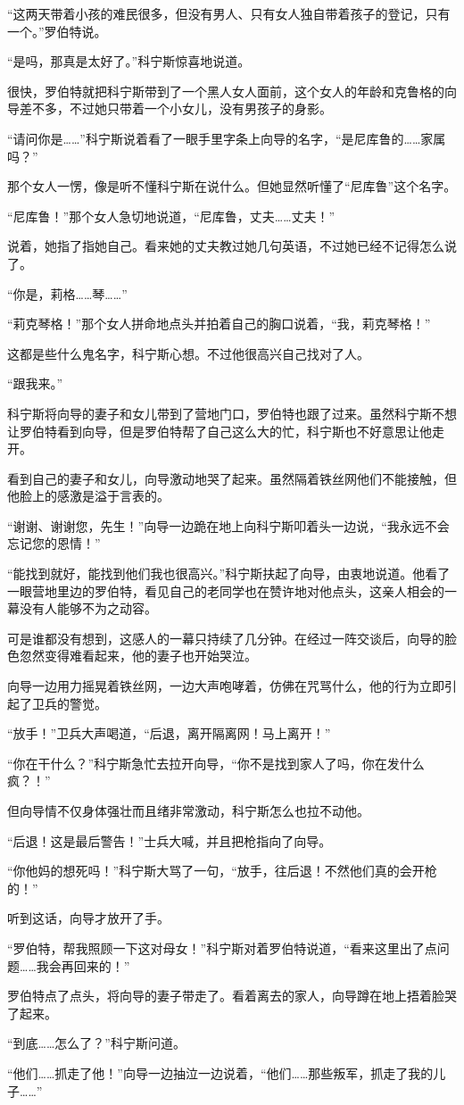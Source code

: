 “这两天带着小孩的难民很多，但没有男人、只有女人独自带着孩子的登记，只有一个。”罗伯特说。

“是吗，那真是太好了。”科宁斯惊喜地说道。

很快，罗伯特就把科宁斯带到了一个黑人女人面前，这个女人的年龄和克鲁格的向导差不多，不过她只带着一个小女儿，没有男孩子的身影。

“请问你是……”科宁斯说着看了一眼手里字条上向导的名字，“是尼库鲁的……家属吗？”

那个女人一愣，像是听不懂科宁斯在说什么。但她显然听懂了“尼库鲁”这个名字。

“尼库鲁！”那个女人急切地说道，“尼库鲁，丈夫……丈夫！”

说着，她指了指她自己。看来她的丈夫教过她几句英语，不过她已经不记得怎么说了。

“你是，莉格……琴……”

“莉克琴格！”那个女人拼命地点头并拍着自己的胸口说着，“我，莉克琴格！”

这都是些什么鬼名字，科宁斯心想。不过他很高兴自己找对了人。

“跟我来。”

科宁斯将向导的妻子和女儿带到了营地门口，罗伯特也跟了过来。虽然科宁斯不想让罗伯特看到向导，但是罗伯特帮了自己这么大的忙，科宁斯也不好意思让他走开。

看到自己的妻子和女儿，向导激动地哭了起来。虽然隔着铁丝网他们不能接触，但他脸上的感激是溢于言表的。

“谢谢、谢谢您，先生！”向导一边跪在地上向科宁斯叩着头一边说，“我永远不会忘记您的恩情！”

“能找到就好，能找到他们我也很高兴。”科宁斯扶起了向导，由衷地说道。他看了一眼营地里边的罗伯特，看见自己的老同学也在赞许地对他点头，这亲人相会的一幕没有人能够不为之动容。

可是谁都没有想到，这感人的一幕只持续了几分钟。在经过一阵交谈后，向导的脸色忽然变得难看起来，他的妻子也开始哭泣。

向导一边用力摇晃着铁丝网，一边大声咆哮着，仿佛在咒骂什么，他的行为立即引起了卫兵的警觉。

“放手！”卫兵大声喝道，“后退，离开隔离网！马上离开！”

“你在干什么？”科宁斯急忙去拉开向导，“你不是找到家人了吗，你在发什么疯？！”

但向导情不仅身体强壮而且绪非常激动，科宁斯怎么也拉不动他。

“后退！这是最后警告！”士兵大喊，并且把枪指向了向导。

“你他妈的想死吗！”科宁斯大骂了一句，“放手，往后退！不然他们真的会开枪的！”

听到这话，向导才放开了手。

“罗伯特，帮我照顾一下这对母女！”科宁斯对着罗伯特说道，“看来这里出了点问题……我会再回来的！”

罗伯特点了点头，将向导的妻子带走了。看着离去的家人，向导蹲在地上捂着脸哭了起来。

“到底……怎么了？”科宁斯问道。

“他们……抓走了他！”向导一边抽泣一边说着，“他们……那些叛军，抓走了我的儿子……”